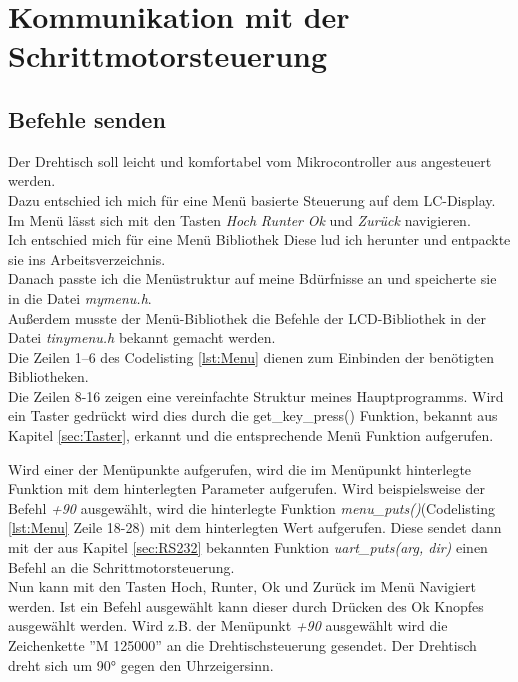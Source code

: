 \section{Kommunikation mit der Schrittmotorsteuerung}
\label{sec:Komm_SM}
\subsection{Befehle senden}
\label{sec:menu}
Der Drehtisch soll leicht und komfortabel vom Mikrocontroller aus angesteuert werden.\\
Dazu entschied ich mich für eine Menü basierte Steuerung auf dem LC-Display. Im Menü lässt sich mit den Tasten \emph{Hoch} \emph{Runter} \emph{Ok} und \emph{Zurück} navigieren.\\
Ich entschied mich für eine Menü Bibliothek Diese lud ich herunter und entpackte sie ins Arbeitsverzeichnis.\\
Danach passte ich die Menüstruktur auf meine Bdürfnisse an und speicherte sie in die Datei \emph{mymenu.h}.\\
Außerdem musste der Menü-Bibliothek die Befehle der LCD-Bibliothek in der Datei \emph{tinymenu.h} bekannt gemacht werden.\\
Die Zeilen 1--6 des Codelisting \ref{lst:Menu} dienen zum Einbinden der benötigten Bibliotheken.\\
Die Zeilen 8-16 zeigen eine vereinfachte Struktur meines  Hauptprogramms. Wird ein Taster gedrückt wird dies durch die get\_key\_press() Funktion, bekannt aus Kapitel \ref{sec:Taster}, erkannt und die entsprechende Menü Funktion aufgerufen.
\lstset{language=C, basicstyle=\footnotesize, showstringspaces=false, tabsize=8}

Wird einer der Menüpunkte aufgerufen, wird die im Menüpunkt hinterlegte Funktion mit dem hinterlegten Parameter aufgerufen.
Wird beispielsweise der Befehl \emph{+90} ausgewählt, wird die hinterlegte Funktion \emph{menu\_puts()}(Codelisting \ref{lst:Menu} Zeile 18-28) mit dem hinterlegten Wert aufgerufen. Diese sendet dann mit der aus Kapitel \ref{sec:RS232} bekannten Funktion \emph{uart\_puts(arg, dir)} einen Befehl an die Schrittmotorsteuerung.\\
Nun kann mit den Tasten Hoch, Runter, Ok und Zurück im Menü Navigiert werden. Ist ein Befehl ausgewählt kann dieser durch Drücken des Ok Knopfes ausgewählt werden. Wird z.B. der Menüpunkt \emph{+90} ausgewählt wird die Zeichenkette ''M 125000'' an die Drehtischsteuerung gesendet. Der Drehtisch dreht sich um 90° gegen den Uhrzeigersinn.
\lstset{language=C, basicstyle=\footnotesize, showstringspaces=false, tabsize=8}

